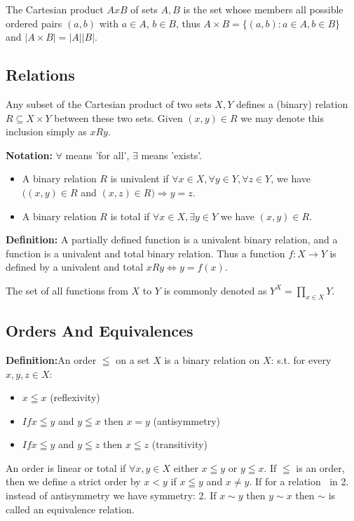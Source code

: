 \documentclass{article}
\begin{document}
The Cartesian product $A x B$ of sets $A, B$ is the set whose members all possible ordered pairs $(a, b)$ with $a \in A$, $b \in B$, thus $A \times B = \{(a,b): a \in A, b \in B \}$ and $|A \times B|=|A||B|$.

\subsection{Relations}
Any subset of the Cartesian product of two sets $X, Y$ defines a (binary) relation $R \subseteq X \times Y$ between these two sets. Given $(x, y) \in R$ we may denote this inclusion simply as $xRy$. 

\textbf{Notation:} $\forall$ means 'for all', $\exists$ means 'exists'.
\begin{itemize}
    \item A binary relation $R$ is univalent if $\forall x \in X, \forall y \in Y, \forall z \in Y$, we have $((x, y) \in R$ and $(x, z) \in R) \Rightarrow y = z$.
    \item A binary relation $R$ is total if $\forall x \in X, \exists y \in Y$ we have $(x, y) \in R$.
\end{itemize}  

\textbf{Definition:} A partially defined function is a univalent binary relation, and a function is a univalent and total binary relation. Thus a function $f: X \rightarrow Y$ is defined by a univalent and total $xRy \iff y = f(x)$. 

The set of all functions from $X$ to $Y$ is commonly denoted as $Y^X = \prod_{x \in X} Y$.

\subsection{Orders And Equivalences}
\textbf{Definition:}An order $\leqq$ on a set $X$ is a binary relation on $X$: s.t. for every $x, y, z \in X$: 
\begin{itemize}
    \item $x\leqq x$ (reflexivity)
    \item $Ifx\leqq y$ and $y \leqq x$ then $x = y$ (antisymmetry)
    \item $Ifx \leqq y$ and $y \leqq z$ then $x \leqq z$ (transitivity)
\end{itemize} 
An order is linear or total if $\forall x, y \in X$ either $x \leqq y$ or $y \leqq x$. If $\leqq$ is an order, then we define a strict order by $x < y$ if $x \leqq y$ and $x \neq y$. If for a relation $~$ in 2. instead of antisymmetry we have symmetry: 2. If $x \sim y$ then $y \sim x$ then $\sim$ is called an equivalence relation.
\end{document}
